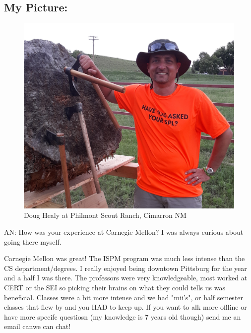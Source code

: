 \subsection{My Picture: }
\begin{figure}[htp]
    \centering
    \includegraphics[scale=.095]{Healy.jpg}
    \caption{Doug Healy at Philmont Scout Ranch, Cimarron NM}
 \end{figure}

AN: How was your experience at Carnegie Mellon? I was always curious about going there myself.

Carnegie Mellon was great! The ISPM program was much less intense than the CS department/degrees. I really enjoyed being downtown Pittsburg for the year and a half I was there. The professors were very knowledgeable, most worked at CERT or the SEI so picking their brains on what they could tells us was beneficial. Classes were a bit more intense and we had "mii's", or half semester classes that flew by and you HAD to keep up. If you want to alk more offline or have more specifc questiosn (my knowledge is 7 years old though) send me an email canwe can chat!

